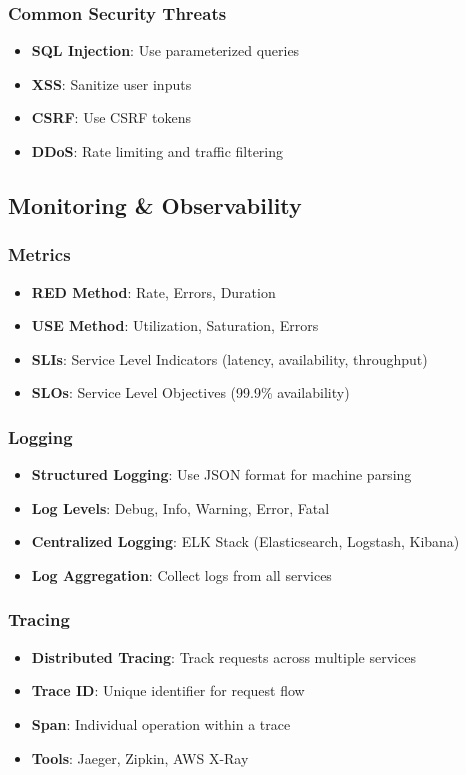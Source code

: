 \documentclass[10pt,a4paper]{article}
\begin{document}
\subsubsection{Common Security Threats}
\begin{itemize}
\item \textbf{SQL Injection}: Use parameterized queries
\item \textbf{XSS}: Sanitize user inputs
\item \textbf{CSRF}: Use CSRF tokens
\item \textbf{DDoS}: Rate limiting and traffic filtering
\end{itemize}

\subsection{Monitoring \& Observability}

\subsubsection{Metrics}
\begin{itemize}
\item \textbf{RED Method}: Rate, Errors, Duration
\item \textbf{USE Method}: Utilization, Saturation, Errors
\item \textbf{SLIs}: Service Level Indicators (latency, availability, throughput)
\item \textbf{SLOs}: Service Level Objectives (99.9\% availability)
\end{itemize}

\subsubsection{Logging}
\begin{itemize}
\item \textbf{Structured Logging}: Use JSON format for machine parsing
\item \textbf{Log Levels}: Debug, Info, Warning, Error, Fatal
\item \textbf{Centralized Logging}: ELK Stack (Elasticsearch, Logstash, Kibana)
\item \textbf{Log Aggregation}: Collect logs from all services
\end{itemize}

\subsubsection{Tracing}
\begin{itemize}
\item \textbf{Distributed Tracing}: Track requests across multiple services
\item \textbf{Trace ID}: Unique identifier for request flow
\item \textbf{Span}: Individual operation within a trace
\item \textbf{Tools}: Jaeger, Zipkin, AWS X-Ray
\end{itemize}
\end{document}
